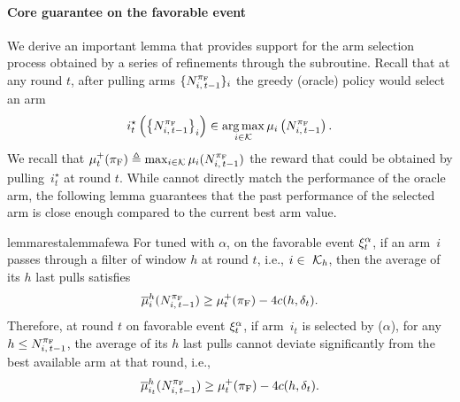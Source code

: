 \paragraph{Core guarantee on the favorable event} 
We derive an important lemma that provides support for the arm selection process obtained by a series of refinements through the \FILTER subroutine. Recall that at any round $t$, after pulling arms $\{ N_{i,\,t-1}^{\pi_{\rm F}}\}_i$ the greedy (oracle) policy would select an arm 
%
\begin{align*}
i^\star_t \left(\left\{ N_{i,\,t-1}^{\pi_{\rm F}} \right\}_i\right)  \in  \operatorname*{arg\,max}_{i \in \mathcal{K}} \mu_i \left( N_{i,\,t-1}^{\pi_{\rm F}}\right).
\end{align*}
%
We recall that $\mu^+_t(\pi_{\rm F}) \triangleq \max_{i \in \mathcal{K}} \mu_i (N_{i,\,t-1}^{\pi_{\rm F}})$ the reward that could be obtained by pulling~$i^\star_t$ at round $t$. 
While \FEWA cannot directly match the performance of the oracle arm, the following lemma guarantees that the past performance of the selected arm is close enough compared to the current best arm value. 

\begin{restatable}{lemma}{restalemmafewa}
\label{lem:core-FEWA}
For \FEWA tuned with $\alpha$, on the favorable event $\xi^\alpha_t$, if an arm~$i$ passes through a filter of window $h$ at round $t$, i.e., $i\in\ \mathcal{K}_h$, then the average of its $h$ last pulls satisfies
%
\begin{equation}\label{eq:fundamental-eq-FEWA}
\overline{\mu}^{h}_i(N_{i,\,t-1}^{\pi_{\rm F}} ) \geq  \mu^+_t(\pi_{\rm F}) - 4 c(h, \delta_t).
\end{equation}
Therefore, at round $t$ on favorable event $\xi^\alpha_t$, if arm~$i_{t}$ is selected by \FEWA($\alpha$), for any $h \leq N_{i,\,t-1}^{\pi_{\rm F}}$,  the average of its $h$ last pulls cannot deviate significantly from the best available arm at that round, i.e.,
%
\begin{equation*}
\overline{\mu}^{h}_{i_{t}}(N_{i,\,t-1}^{\pi_{\rm F}}) \geq \mu^+_t(\pi_{\rm F}) - 4 c(h, \delta_{t}).
\end{equation*}
\end{restatable}

